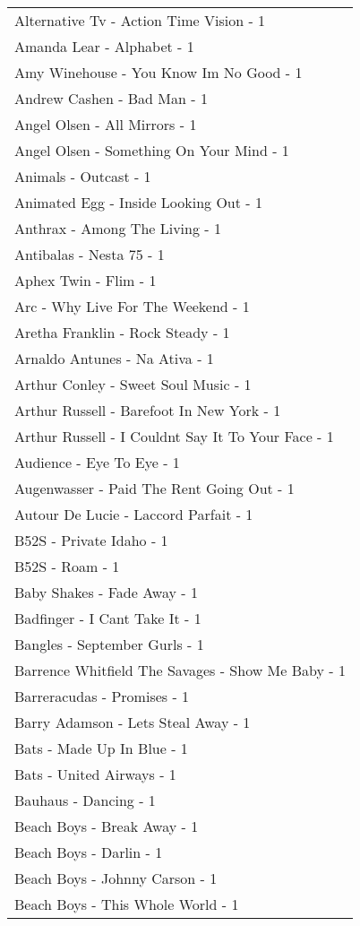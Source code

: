 \documentclass[
]{article}
\begin{document}
\begin{longtable}{l}
Alternative Tv - Action Time Vision - 1 \\ 
Amanda Lear - Alphabet - 1 \\ 
Amy Winehouse - You Know Im No Good - 1 \\ 
Andrew Cashen - Bad Man - 1 \\ 
Angel Olsen - All Mirrors - 1 \\ 
Angel Olsen - Something On Your Mind - 1 \\ 
Animals - Outcast - 1 \\ 
Animated Egg - Inside Looking Out - 1 \\ 
Anthrax - Among The Living - 1 \\ 
Antibalas - Nesta 75 - 1 \\ 
Aphex Twin - Flim - 1 \\ 
Arc - Why Live For The Weekend - 1 \\ 
Aretha Franklin - Rock Steady - 1 \\ 
Arnaldo Antunes - Na Ativa - 1 \\ 
Arthur Conley - Sweet Soul Music - 1 \\ 
Arthur Russell - Barefoot In New York - 1 \\ 
Arthur Russell - I Couldnt Say It To Your Face - 1 \\ 
Audience - Eye To Eye - 1 \\ 
Augenwasser - Paid The Rent Going Out - 1 \\ 
Autour De Lucie - Laccord Parfait - 1 \\ 
B52S - Private Idaho - 1 \\ 
B52S - Roam - 1 \\ 
Baby Shakes - Fade Away - 1 \\ 
Badfinger - I Cant Take It - 1 \\ 
Bangles - September Gurls - 1 \\ 
Barrence Whitfield The Savages - Show Me Baby - 1 \\ 
Barreracudas - Promises - 1 \\ 
Barry Adamson - Lets Steal Away - 1 \\ 
Bats - Made Up In Blue - 1 \\ 
Bats - United Airways - 1 \\ 
Bauhaus - Dancing - 1 \\ 
Beach Boys - Break Away - 1 \\ 
Beach Boys - Darlin - 1 \\ 
Beach Boys - Johnny Carson - 1 \\ 
Beach Boys - This Whole World - 1 \\ 

\end{longtable}
\end{document}
